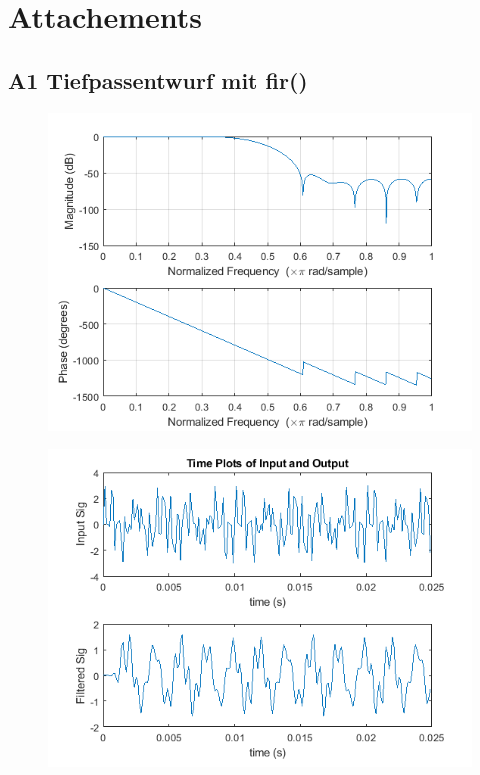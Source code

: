 \section{Attachements}

\subsection{A1 Tiefpassentwurf mit fir()}


 

\begin{figure}
\centering
\includegraphics[width=0.7\linewidth]{Bilder/Attachment_A1_fir_2a_Amplitudengang}
\caption{}
\label{fig:Attachment_A1_fir_2a_Amplitudengang}
\end{figure}

\begin{figure}
\centering
\includegraphics[width=0.7\linewidth]{Bilder/Attachment_A1_fir_2a_Timeplot}
\caption{}
\label{fig:Attachment_A1_fir_2a_Timeplot}
\end{figure}

